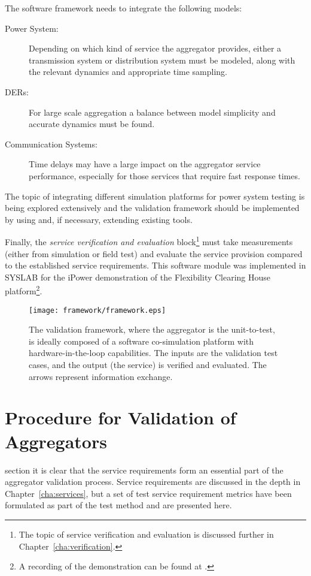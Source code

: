 The software framework needs to integrate the following models:
\begin{description}
	\item[Power System:] Depending on which kind of service the aggregator provides, either a transmission system or distribution system must be modeled, along with the relevant dynamics and appropriate time sampling.
	\item[DERs:] For large scale aggregation a balance between model simplicity and accurate dynamics must be found.
	\item[Communication Systems:] Time delays may have a large impact on the aggregator service performance, especially for those services that require fast response times.
\end{description}

The topic of integrating different simulation platforms for power system testing is being explored extensively and the validation framework should be implemented by using and, if necessary, extending existing tools.

Finally, the \emph{service verification and evaluation} block\footnote{The topic of service verification and evaluation is discussed further in Chapter~\ref{cha:verification}.} must take measurements (either from simulation or field test) and evaluate the service provision compared to the established service requirements. This software module was implemented in SYSLAB for the iPower demonstration of the Flexibility Clearing House platform\footnote{A recording of the demonstration can be found at \cite{ipowerdemo}.}.

\begin{figure}[ht]
	\centering
	\caption{The validation framework, where the aggregator is the unit-to-test, is ideally composed of a software co-simulation platform with hardware-in-the-loop capabilities. The inputs are the validation test cases, and the output (\ie the service) is verified and evaluated. The arrows represent information exchange.}
	\texttt{[image: framework/framework.eps]}\label{fig:frameworkbig}
\end{figure}

\section{Procedure for Validation of Aggregators} 
 section it is clear that the service requirements form an essential part of the aggregator validation process. Service requirements are discussed in the depth in Chapter~\ref{cha:services}, but a set of test service requirement metrics have been formulated as part of the test method and are presented here.


